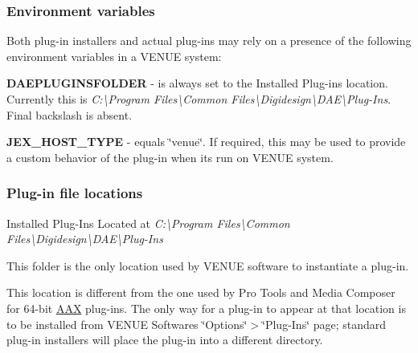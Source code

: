 \hypertarget{a00849_subsection__aax_venue_guide__system_details__environment_vars}{}\subsubsection{Environment variables}\label{a00849_subsection__aax_venue_guide__system_details__environment_vars}
 Both plug-\/in installers and actual plug-\/ins may rely on a presence of the following environment variables in a V\+E\+N\+UE system\+: 
\begin{DoxyItemize}
\item {\bfseries{{\ttfamily D\+A\+E\+P\+L\+U\+G\+I\+N\+S\+F\+O\+L\+D\+ER}}} -\/ is always set to the Installed Plug-\/ins location. Currently this is {\itshape C\+:\textbackslash{}Program Files\textbackslash{}Common Files\textbackslash{}Digidesign\textbackslash{}D\+AE\textbackslash{}Plug-\/\+Ins}. Final backslash is absent.  
\item {\bfseries{{\ttfamily J\+E\+X\+\_\+\+H\+O\+S\+T\+\_\+\+T\+Y\+PE}}} -\/ equals \char`\"{}venue\char`\"{}. If required, this may be used to provide a custom behavior of the plug-\/in when it\textquotesingle{}s run on V\+E\+N\+UE system.  
\end{DoxyItemize}

\hypertarget{a00849_subsection__aax_venue_guide__system_details__plugin_locations}{}\subsubsection{Plug-\/in file locations}\label{a00849_subsection__aax_venue_guide__system_details__plugin_locations}
 Installed Plug-\/\+Ins Located at {\itshape C\+:\textbackslash{}Program Files\textbackslash{}Common Files\textbackslash{}Digidesign\textbackslash{}D\+AE\textbackslash{}Plug-\/\+Ins}

 This folder is the only location used by V\+E\+N\+UE software to instantiate a plug-\/in.

 This location is different from the one used by Pro Tools and Media Composer for 64-\/bit \mbox{\hyperlink{a00852}{A\+AX}} plug-\/ins. The only way for a plug-\/in to appear at that location is to be installed from V\+E\+N\+UE Software\textquotesingle{}s \char`\"{}\+Options\char`\"{}$>$\char`\"{}\+Plug-\/\+Ins\char`\"{} page; standard plug-\/in installers will place the plug-\/in into a different directory.

